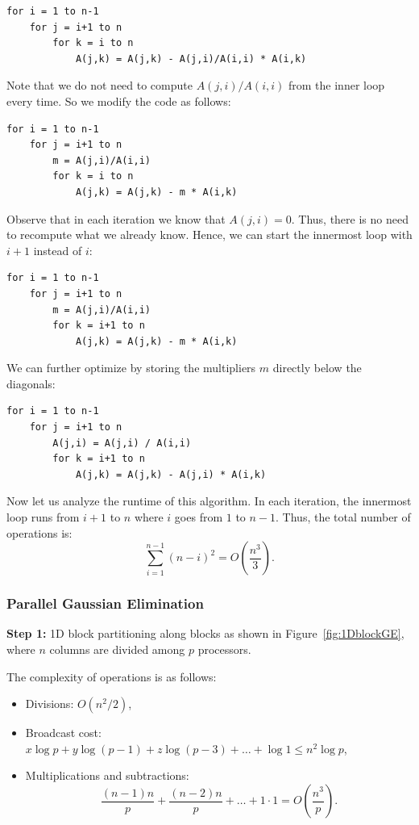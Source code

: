 \documentclass[12pt]{book}
\begin{document}
\begin{lstlisting}[style=cppstyle]
for i = 1 to n-1
    for j = i+1 to n
        for k = i to n
            A(j,k) = A(j,k) - A(j,i)/A(i,i) * A(i,k)
\end{lstlisting}

Note that we do not need to compute $A(j,i)/A(i,i)$ from the inner loop every time. So we modify the code as follows:

\begin{lstlisting}[style=cppstyle]
for i = 1 to n-1
    for j = i+1 to n
        m = A(j,i)/A(i,i)
        for k = i to n
            A(j,k) = A(j,k) - m * A(i,k)
\end{lstlisting}

Observe that in each iteration we know that $A(j,i) = 0$. Thus, there is no need to recompute what we already know. Hence, we can start the innermost loop with $i+1$ instead of $i$:

\begin{lstlisting}[style=cppstyle]
for i = 1 to n-1
    for j = i+1 to n
        m = A(j,i)/A(i,i)
        for k = i+1 to n
            A(j,k) = A(j,k) - m * A(i,k)
\end{lstlisting}

We can further optimize by storing the multipliers $m$ directly below the diagonals:

\begin{lstlisting}[style=cppstyle]
for i = 1 to n-1
    for j = i+1 to n
        A(j,i) = A(j,i) / A(i,i)
        for k = i+1 to n
            A(j,k) = A(j,k) - A(j,i) * A(i,k)
\end{lstlisting}

Now let us analyze the runtime of this algorithm. In each iteration, the innermost loop runs from $i+1$ to $n$ where $i$ goes from $1$ to $n-1$. Thus, the total number of operations is:
\[
\sum_{i=1}^{n-1} (n-i)^2 = O\!\left(\frac{n^3}{3}\right).
\]

\subsubsection{Parallel Gaussian Elimination}
\textbf{Step 1:} 1D block partitioning along blocks as shown in Figure~\ref{fig:1DblockGE}, where $n$ columns are divided among $p$ processors.  

The complexity of operations is as follows:
\begin{itemize}
    \item Divisions: $O(n^2/2)$,
    \item Broadcast cost: $x \log p + y \log(p-1) + z \log(p-3) + \ldots + \log 1 \leq n^2 \log p$,
    \item Multiplications and subtractions: 
    \[
        \frac{(n-1)n}{p} + \frac{(n-2)n}{p} + \ldots + 1 \cdot 1 = O\!\left(\frac{n^3}{p}\right).
    \]
\end{itemize}
\end{document}
